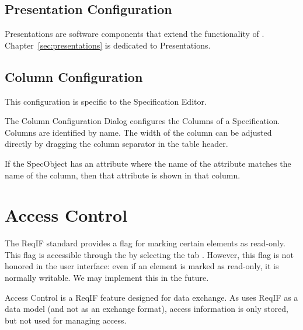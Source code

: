 \subsection{Presentation Configuration}
\label{sec:presentation_configuration}

Presentations are software components that extend the functionality of \pror{}.  Chapter~\ref{sec:presentations} is dedicated to Presentations.

\subsection{Column Configuration}
\label{sec:column_configuration}

This configuration is specific to the Specification Editor.

The Column Configuration Dialog configures the Columns of a
Specification.  Columns are identified by name.  The width of the column
can be adjusted directly by dragging the column separator in the table
header.

If the SpecObject has an attribute where the name of the attribute
matches the name of the column, then that attribute is shown in that
column.

\section{Access Control}
\label{sec:access-control}

The ReqIF standard provides a flag for marking certain elements as read-only.  This flag is accessible through the  by selecting the tab .  However, this flag is not honored in the user interface: even if an element is marked as read-only, it is normally writable.  We may implement this in the future.

\begin{warning}
Access Control is a ReqIF feature designed for data exchange.  As \pror{} uses ReqIF as a data model (and not as an exchange format), access information is only stored, but not used for managing access.
\end{warning}

